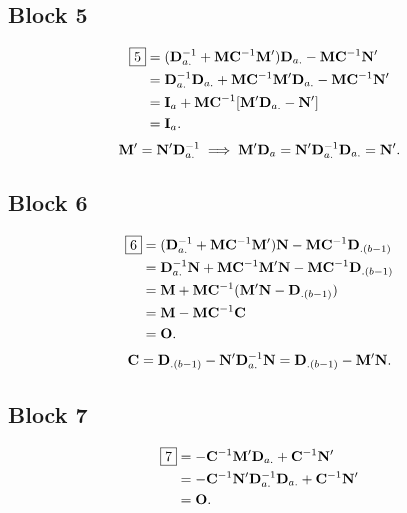 \subsection*{Block 5}
\begin{align*}
    \boxed{5}
     & =(\mathbf{D}_{a.}^{-1}+\mathbf{M}\mathbf{C}^{-1}\mathbf{M}')\mathbf{D}_{a.}-\mathbf{M}\mathbf{C}^{-1}\mathbf{N}'              \\
     & =\mathbf{D}_{a.}^{-1}\mathbf{D}_{a.}+\mathbf{M}\mathbf{C}^{-1}\mathbf{M}'\mathbf{D}_{a.}-\mathbf{M}\mathbf{C}^{-1}\mathbf{N}' \\
     & =\mathbf{I}_a+\mathbf{M}\mathbf{C}^{-1}[\mathbf{M}'\mathbf{D}_{a.}-\mathbf{N}']                                               \\
     & =\mathbf{I}_a.
\end{align*}
\[ \mathbf{M}'=\mathbf{N}'\mathbf{D}_{a.}^{-1}
    \implies \mathbf{M}'\mathbf{D}_a=\mathbf{N}'\mathbf{D}_{a.}^{-1}\mathbf{D}_{a.}=\mathbf{N}'. \]
\subsection*{Block 6}
\begin{align*}
    \boxed{6}
     & =(\mathbf{D}_{a.}^{-1}+\mathbf{M}\mathbf{C}^{-1}\mathbf{M}')\mathbf{N}-\mathbf{M}\mathbf{C}^{-1}\mathbf{D}_{.(b-1)}         \\
     & =\mathbf{D}_{a.}^{-1}\mathbf{N}+\mathbf{M}\mathbf{C}^{-1}\mathbf{M}'\mathbf{N}-\mathbf{M}\mathbf{C}^{-1}\mathbf{D}_{.(b-1)} \\
     & =\mathbf{M}+\mathbf{M}\mathbf{C}^{-1}(\mathbf{M}'\mathbf{N}-\mathbf{D}_{.(b-1)})                                            \\
     & =\mathbf{M}-\mathbf{M}\mathbf{C}^{-1}\mathbf{C}                                                                             \\
     & =\mathbf{O}.
\end{align*}
\[ \mathbf{C}=\mathbf{D}_{.(b-1)}-\mathbf{N}'\mathbf{D}_{a.}^{-1}\mathbf{N}=\mathbf{D}_{.(b-1)}-\mathbf{M}'\mathbf{N}. \]
\subsection*{Block 7}
\begin{align*}
    \boxed{7}
     & =-\mathbf{C}^{-1}\mathbf{M}'\mathbf{D}_{a.}+\mathbf{C}^{-1}\mathbf{N}'                     \\
     & =-\mathbf{C}^{-1}\mathbf{N}'\mathbf{D}_{a.}^{-1}\mathbf{D}_{a.}+\mathbf{C}^{-1}\mathbf{N}' \\
     & =\mathbf{O}.
\end{align*}
